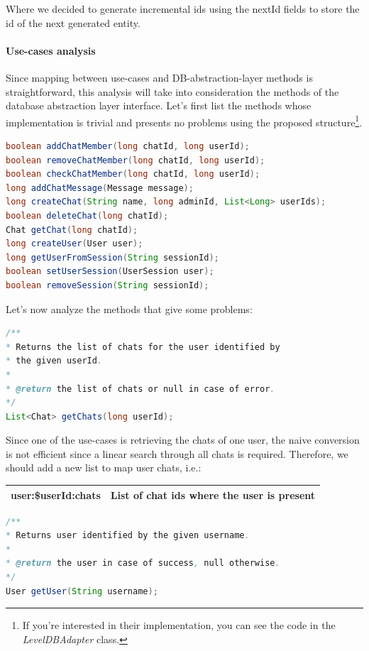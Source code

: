 \documentclass[10pt]{article}
\begin{document}
Where we decided to generate incremental ids using the nextId fields to store 
the id of the next generated entity.

\paragraph{Use-cases analysis}
Since mapping between use-cases and DB-abstraction-layer methods is 
straightforward, this analysis will take into consideration the 
methods of the database abstraction layer interface. Let's first list the 
methods whose implementation is trivial and presents no problems using the
proposed structure\footnote{If you're interested in their implementation, you 
can see the code in the \emph{LevelDBAdapter} class.}. 

\begin{lstlisting}[language = Java]
boolean addChatMember(long chatId, long userId);
boolean removeChatMember(long chatId, long userId);
boolean checkChatMember(long chatId, long userId);
long addChatMessage(Message message);
long createChat(String name, long adminId, List<Long> userIds);
boolean deleteChat(long chatId);
Chat getChat(long chatId);
long createUser(User user);
long getUserFromSession(String sessionId);
boolean setUserSession(UserSession user);
boolean removeSession(String sessionId);
\end{lstlisting}

Let's now analyze the methods that give some problems:

\begin{lstlisting}[language = Java]
/**
* Returns the list of chats for the user identified by 
* the given userId.
*
* @return the list of chats or null in case of error.
*/
List<Chat> getChats(long userId);
\end{lstlisting}

Since one of the use-cases is retrieving the chats of one user, the naive
conversion is not efficient since a linear search through all chats is required.
Therefore, we should add a new list to map user chats, i.e.:

\begin{center}
    \begin{tabular}{ | c | c | }
        \hline
        user:\$userId:chats & List of chat ids where the user is present \\\hline
    \end{tabular}
\end{center}

\begin{lstlisting}[language = Java]
/**
* Returns user identified by the given username.
*
* @return the user in case of success, null otherwise.
*/
User getUser(String username);
\end{lstlisting}
\end{document}
